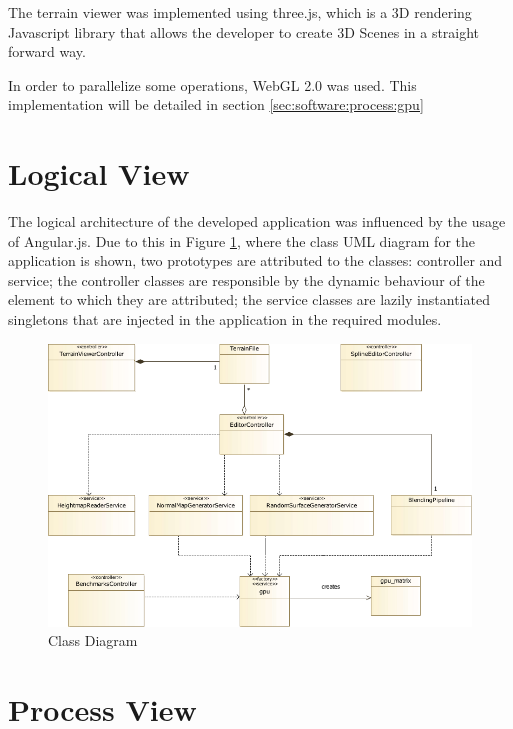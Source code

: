      The terrain viewer was implemented using three.js, which is a 3D rendering Javascript library that allows the developer to create 3D Scenes in a straight forward way. 
      
      In order to parallelize some operations, WebGL 2.0 was used. This implementation will be detailed in section \ref{sec:software:process:gpu}
    
  \section {Logical View} %
  
	  The logical architecture of the developed application was influenced by the usage of Angular.js. Due to this in Figure \ref{fig:class_diagram}, where the class UML diagram for the application is shown, two prototypes are attributed to the classes: controller and service; the controller classes are responsible by the dynamic behaviour of the element to which they are attributed; the service classes are lazily instantiated singletons that are injected in the application in the required modules.
    
    \begin{figure}[H]
    	\begin{center}
    		\includegraphics[width=\textwidth]{images/diagrams/class.pdf}
    	\end{center}
    	\caption{Class Diagram}
    	\label{fig:class_diagram}
    \end{figure}
    
  \section {Process View}
    
